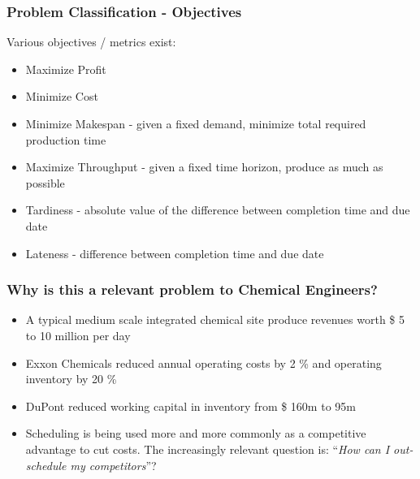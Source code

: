 \begin{frame}\frametitle{Problem Classification - Objectives}
	
	Various objectives / metrics exist:
	\begin{itemize}
		
		\item	Maximize Profit		
		\item	Minimize Cost		
		\item	Minimize {\color{purple}Makespan} - given a fixed demand, minimize total required production time 
		\newline
		
		\item	Maximize Throughput - given a fixed time horizon, produce as much as possible 
		\newline
		
		\item	{\color{purple}Tardiness} - absolute value of the difference between completion time and due date 
		\newline
		
		\item	{\color{purple}Lateness} - difference between completion time and due date
	\end{itemize}
\end{frame}

\begin{frame}\frametitle{Why is this a relevant problem to Chemical Engineers?}
	\begin{itemize}
		
		\item	A typical medium scale integrated chemical site produce revenues worth \$ 5 to 10 million per day \cite{ShobW} 
		\item	Exxon Chemicals reduced annual operating costs by 2 \% and operating inventory by 20 \% \cite{ShobW} 
		\item	DuPont reduced working capital in inventory from \$ 160m to 95m \cite{ShobW} 
		\item	Scheduling is being used more and more commonly as a competitive advantage to cut costs. The increasingly relevant question is: ``{\color{myOrange}\emph{How can I out-schedule my competitors}}''?
	\end{itemize}
\end{frame}

